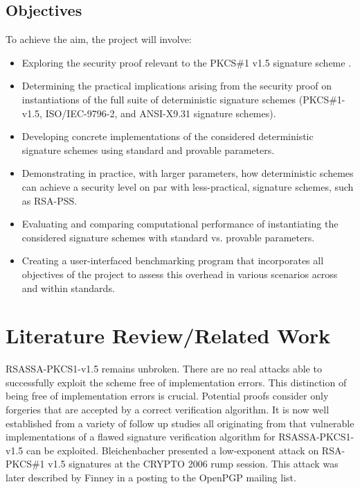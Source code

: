 \documentclass[]{final_report}
\theoremstyle{definition}
\begin{document}
\section{Objectives}
To achieve the aim, the project will involve:
\begin{itemize}
    \item Exploring the security proof relevant to the PKCS\#1 v1.5 signature scheme .
    \item Determining the practical implications arising from the security proof on instantiations of the full suite of deterministic signature schemes (PKCS\#1-v1.5, ISO/IEC-9796-2, and ANSI-X9.31 signature schemes).
    \item Developing concrete implementations of the considered deterministic signature schemes using standard and provable parameters.
    \item Demonstrating in practice, with larger parameters, how deterministic schemes can achieve a security level on par with less-practical, signature schemes, such as RSA-PSS.
      \item Evaluating and comparing computational performance of instantiating the considered signature schemes with standard vs. provable parameters. 
     \item Creating a user-interfaced benchmarking program that incorporates all objectives of the project to assess this overhead in various scenarios across and within standards.

\end{itemize}



 
\chapter{Literature Review/Related Work}
RSASSA-PKCS1-v1.5 remains unbroken. There are no real attacks able to successfully exploit the scheme free of implementation errors. This distinction of being free of implementation errors is crucial. Potential proofs consider only forgeries that are accepted by a correct verification algorithm. It is now well established from a variety of follow up studies all originating from \cite{bleichenbacher1998chosen} that vulnerable implementations of a flawed signature verification algorithm for RSASSA-PKCS1-v1.5 can be exploited. Bleichenbacher presented a low-exponent attack on RSA-PKCS\#1 v1.5 signatures at the CRYPTO 2006 rump session. This attack was later described by Finney \cite{finney2006bleichenbacher} in a posting to the OpenPGP mailing list. 
\end{document}
